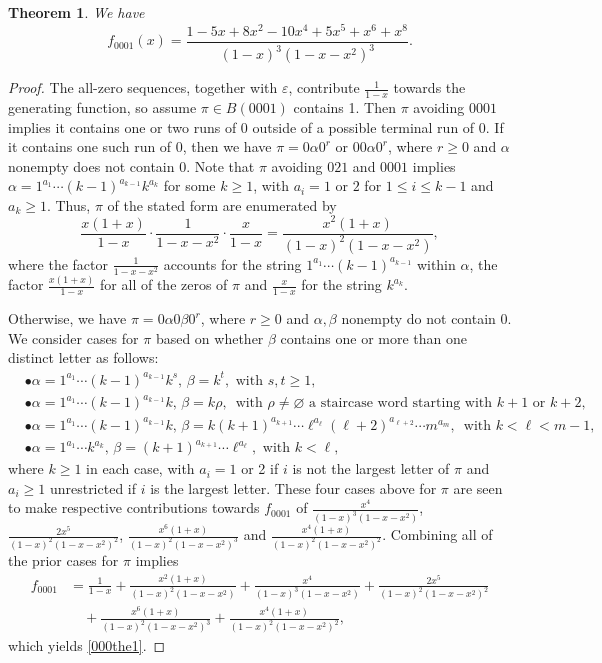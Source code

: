 \documentclass{article}
\theoremstyle{remark}
\theoremstyle{plain}
\newtheorem{theorem}{Theorem}[section]
\begin{document}
\begin{theorem}\label{0001th}
We have
\begin{equation}\label{000the1}
f_{0001}(x)=\frac{1-5x+8x^2-10x^4+5x^5+x^6+x^8}{(1-x)^3(1-x-x^2)^3}.
\end{equation}
\end{theorem}
\begin{proof}
The all-zero sequences, together with $\varepsilon$, contribute $\frac{1}{1-x}$ towards the generating function, so assume $\pi \in B(0001)$ contains 1.  Then $\pi$ avoiding $0001$ implies it contains one or two runs of 0 outside of a possible terminal run of 0.  If it contains one such run of 0, then we have $\pi=0\alpha0^r$ or $00\alpha0^r$, where $r \geq0$ and $\alpha$ nonempty does not contain 0. Note that $\pi$ avoiding $021$ and $0001$ implies $\alpha=1^{a_1}\cdots(k-1)^{a_{k-1}}k^{a_k}$ for some $k \geq1$, with $a_i=1$ or $2$ for $1 \leq i \leq k-1$ and $a_k \geq 1$.  Thus, $\pi$ of the stated form are enumerated by
$$\frac{x(1+x)}{1-x}\cdot\frac{1}{1-x-x^2}\cdot\frac{x}{1-x}=\frac{x^2(1+x)}{(1-x)^2(1-x-x^2)},$$
where the factor $\frac{1}{1-x-x^2}$ accounts for the string $1^{a_1}\cdots (k-1)^{a_{k-1}}$ within $\alpha$, the factor $\frac{x(1+x)}{1-x}$ for all of the zeros of $\pi$ and $\frac{x}{1-x}$ for the string $k^{a_k}$.

Otherwise, we have $\pi=0\alpha0\beta0^r$, where $r \geq0$ and $\alpha,\beta$ nonempty do not contain 0.  We consider cases for $\pi$ based on whether $\beta$ contains one or more than one distinct letter as follows:
\begin{align*}
&\bullet\alpha=1^{a_1}\cdots(k-1)^{a_{k-1}}k^s,\,\beta=k^t, \text{ with } s,t \geq 1,\\
&\bullet\alpha=1^{a_1}\cdots(k-1)^{a_{k-1}}k,\,\beta=k\rho,\,\text{ with } \rho\neq\varnothing \text{ a staircase word starting with } k+1 \text{ or } k+2,\\
&\bullet\alpha=1^{a_1}\cdots(k-1)^{a_{k-1}}k,\,\beta=k(k+1)^{a_{k+1}}\cdots \ell^{a_\ell}(\ell+2)^{a_{\ell+2}}\cdots m^{a_m},\,\text{ with } k<\ell<m-1,\\
&\bullet\alpha=1^{a_1}\cdots k^{a_k},\, \beta=(k+1)^{a_{k+1}}\cdots \ell^{a_\ell}, \text{ with } k<\ell,
\end{align*}
where $k \geq 1$ in each case, with $a_i=1$ or 2 if $i$ is not the largest letter of $\pi$ and $a_i\geq1$ unrestricted if $i$ is the largest letter.  These four cases above for $\pi$ are seen to make respective contributions towards $f_{0001}$ of $\frac{x^4}{(1-x)^3(1-x-x^2)}$, $\frac{2x^5}{(1-x)^2(1-x-x^2)^2}$, $\frac{x^6(1+x)}{(1-x)^2(1-x-x^2)^3}$ and $\frac{x^4(1+x)}{(1-x)^2(1-x-x^2)^2}$.
Combining all of the prior cases for $\pi$ implies
\begin{align*}
f_{0001}&=\frac{1}{1-x}+\frac{x^2(1+x)}{(1-x)^2(1-x-x^2)}+\frac{x^4}{(1-x)^3(1-x-x^2)}+ \frac{2x^5}{(1-x)^2(1-x-x^2)^2}\\
&\quad+\frac{x^6(1+x)}{(1-x)^2(1-x-x^2)^3}+\frac{x^4(1+x)}{(1-x)^2(1-x-x^2)^2},
\end{align*}
which yields \eqref{000the1}.
\end{proof}
\end{document}
